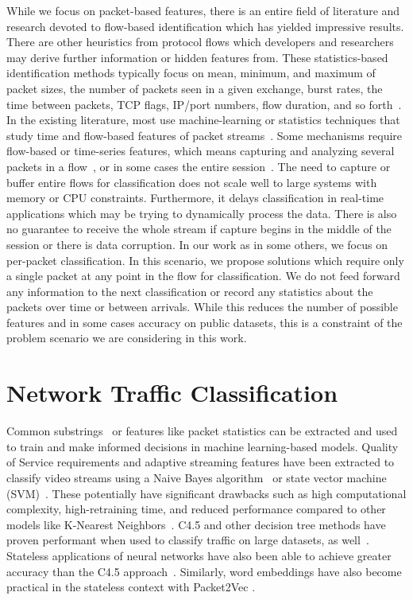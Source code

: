 While we focus on packet-based features, there is an entire field of literature and research devoted to flow-based identification which has yielded impressive results. There are other heuristics from protocol flows which developers and researchers may derive further information or hidden features from. These statistics-based identification methods typically focus on mean, minimum, and maximum of packet sizes, the number of packets seen in a given exchange, burst rates, the time between packets, TCP flags, IP/port numbers, flow duration, and so forth~\cite{Moore2013DiscriminatorsFU, ZHAO202122, Paxson}.
In the existing literature, most use machine-learning or statistics techniques that study time and flow-based features of packet streams~\cite{Salman, Cao, Lim, LiZ, Song2019, iscx-vpn-paper, iscx-tor-paper}. Some mechanisms require flow-based or time-series features, which means capturing and analyzing several packets in a flow~\cite{onlyheader, zhou2018encrypted}, or in some cases the entire session~\cite{perera2017comparison, deeppacket, panchenko2011website, amaral2016machine, cao2014survey, ibrahim2016internet, fan2017investigation, sun2018internet}. The need to capture or buffer entire flows for classification does not scale well to large systems with memory or CPU constraints. Furthermore, it delays classification in real-time applications which may be trying to dynamically process the data. There is also no guarantee to receive the whole stream if capture begins in the middle of the session or there is data corruption. In our work as in some others, we focus on per-packet classification. In this scenario, we propose solutions which require only a single packet at any point in the flow for classification. We do not feed forward any information to the next classification or record any statistics about the packets over time or between arrivals. While this reduces the number of possible features and in some cases accuracy on public datasets, this is a constraint of the problem scenario we are considering in this work.

\section{Network Traffic Classification}

Common substrings~\cite{sigbox} or features like packet statistics can be extracted and used to train and make informed decisions in machine learning-based models. Quality of Service requirements and adaptive streaming features have been extracted to classify video streams using a Naive Bayes algorithm~\cite{DIAS2019143} or state vector machine (SVM)~\cite{LiZ, Cao}. These potentially have significant drawbacks such as high computational complexity, high-retraining time, and reduced performance compared to other models like K-Nearest Neighbors~\cite{Salman}. C4.5 and other decision tree methods have proven performant when used to classify traffic on large datasets, as well~\cite{Yuan, iscx-vpn-paper}. Stateless applications of neural networks have also been able to achieve greater accuracy than the C4.5 approach~\cite{deeppacket}. Similarly, word embeddings have also become practical in the stateless context with Packet2Vec \cite{packet2vec}.
